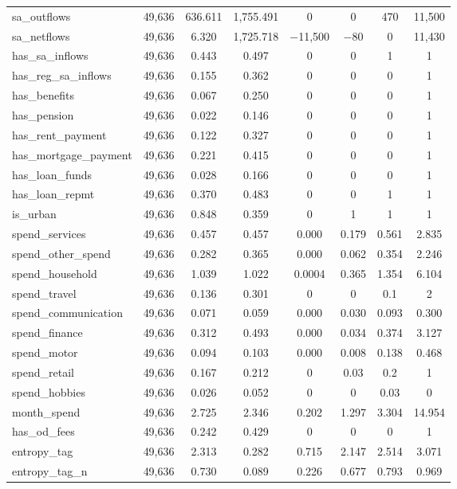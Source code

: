 \begin{table}[!htbp]
\begin{tabular}{@{\extracolsep{5pt}}lccccccc}
sa\_outflows & 49,636 & 636.611 & 1,755.491 & 0 & 0 & 470 & 11,500 \\ 
sa\_netflows & 49,636 & 6.320 & 1,725.718 & $-$11,500 & $-$80 & 0 & 11,430 \\ 
has\_sa\_inflows & 49,636 & 0.443 & 0.497 & 0 & 0 & 1 & 1 \\ 
has\_reg\_sa\_inflows & 49,636 & 0.155 & 0.362 & 0 & 0 & 0 & 1 \\ 
has\_benefits & 49,636 & 0.067 & 0.250 & 0 & 0 & 0 & 1 \\ 
has\_pension & 49,636 & 0.022 & 0.146 & 0 & 0 & 0 & 1 \\ 
has\_rent\_payment & 49,636 & 0.122 & 0.327 & 0 & 0 & 0 & 1 \\ 
has\_mortgage\_payment & 49,636 & 0.221 & 0.415 & 0 & 0 & 0 & 1 \\ 
has\_loan\_funds & 49,636 & 0.028 & 0.166 & 0 & 0 & 0 & 1 \\ 
has\_loan\_repmt & 49,636 & 0.370 & 0.483 & 0 & 0 & 1 & 1 \\ 
is\_urban & 49,636 & 0.848 & 0.359 & 0 & 1 & 1 & 1 \\ 
spend\_services & 49,636 & 0.457 & 0.457 & 0.000 & 0.179 & 0.561 & 2.835 \\ 
spend\_other\_spend & 49,636 & 0.282 & 0.365 & 0.000 & 0.062 & 0.354 & 2.246 \\ 
spend\_household & 49,636 & 1.039 & 1.022 & 0.0004 & 0.365 & 1.354 & 6.104 \\ 
spend\_travel & 49,636 & 0.136 & 0.301 & 0 & 0 & 0.1 & 2 \\ 
spend\_communication & 49,636 & 0.071 & 0.059 & 0.000 & 0.030 & 0.093 & 0.300 \\ 
spend\_finance & 49,636 & 0.312 & 0.493 & 0.000 & 0.034 & 0.374 & 3.127 \\ 
spend\_motor & 49,636 & 0.094 & 0.103 & 0.000 & 0.008 & 0.138 & 0.468 \\ 
spend\_retail & 49,636 & 0.167 & 0.212 & 0 & 0.03 & 0.2 & 1 \\ 
spend\_hobbies & 49,636 & 0.026 & 0.052 & 0 & 0 & 0.03 & 0 \\ 
month\_spend & 49,636 & 2.725 & 2.346 & 0.202 & 1.297 & 3.304 & 14.954 \\ 
has\_od\_fees & 49,636 & 0.242 & 0.429 & 0 & 0 & 0 & 1 \\ 
entropy\_tag & 49,636 & 2.313 & 0.282 & 0.715 & 2.147 & 2.514 & 3.071 \\ 
entropy\_tag\_n & 49,636 & 0.730 & 0.089 & 0.226 & 0.677 & 0.793 & 0.969 \\ 

\end{tabular}
\end{table}
